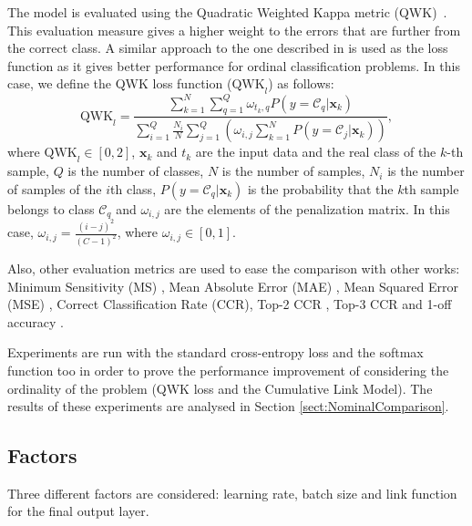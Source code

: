 \documentclass[journal]{IEEEtran}
\begin{document}
	The model is evaluated using the Quadratic Weighted Kappa metric (QWK)~\cite{ben2008comparison}. This evaluation measure gives a higher weight to the errors that are further from the correct class. A similar approach to the one described in \cite{de2018weighted} is used as the loss function as it gives better performance for ordinal classification problems. In this case, we define the QWK loss function ($\text{QWK}_l$) as follows:
	\begin{equation}
	\text{QWK}_l = \frac{\sum\limits_{k=1}^N \sum\limits_{q=1}^Q \omega_{t_k, q} P(y = \mathcal{C}_q | \mathbf{x}_k)}{\sum\limits_{i=1}^Q \frac{N_i}{N} \sum\limits_{j=1}^Q ( \omega_{i,j} \sum\limits_{k=1}^N P(y = \mathcal{C}_j | \mathbf{x}_k))},
	\end{equation}
	where $\text{QWK}_l \in [0,2]$, $\mathbf{x}_k$ and $t_k$ are the input data and the real class of the $k$-th sample, $Q$ is the number of classes, $N$ is the number of samples, $N_i$ is the number of samples of the $i$th class, $P(y = \mathcal{C}_q | \mathbf{x}_k)$ is the probability that the $k$th sample belongs to class $\mathcal{C}_q$ and $\omega_{i,j}$ are the elements of the penalization matrix. In this case, $\omega_{i,j} = \frac{(i-j)^2}{(C-1)^2}$, where $\omega_{i,j} \in [0,1]$.
	
	Also, other evaluation metrics are used to ease the comparison with other works: Minimum Sensitivity (MS) \cite{cruz2014metrics}, Mean Absolute Error (MAE) \cite{cruz2014metrics}, Mean Squared Error (MSE) \cite{wang2009mean}, Correct Classification Rate (CCR), Top-2 CCR \cite{beckham2017unimodal}, Top-3 CCR \cite{beckham2017unimodal} and 1-off accuracy \cite{chen2016cascaded,levi2015age,eidinger2014age}.
	
	Experiments are run with the standard cross-entropy loss and the softmax function too in order to prove the performance improvement of considering the ordinality of the problem (QWK loss and the Cumulative Link Model). The results of these experiments are analysed in Section \ref{sect:NominalComparison}.
	
	\subsection{Factors}
	Three different factors are considered: learning rate, batch size and link function for the final output layer.
	
\end{document}
